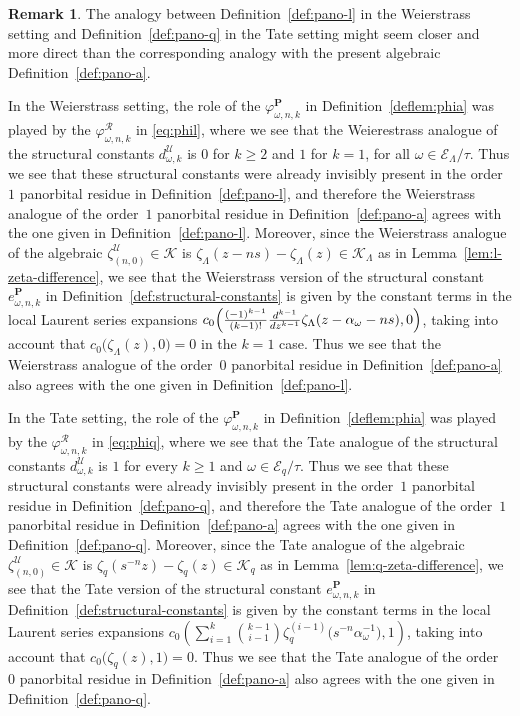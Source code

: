 \documentclass[preprint,12pt]{elsarticle}
\numberwithin{equation}{section} %
\theoremstyle{theorem}
\theoremstyle{definition}
\newtheorem{remark}[theorem]{Remark}
\newcommand{\bk}{\mathcal{K}} %
\newcommand{\bkl}{\bk_{\Lambda}} %
\newcommand{\bkq}{\bk_{q}} %
\newcommand{\ec}{\mathcal{E}} %
\newcommand{\ecl}{\ec_{\Lambda}} %
\newcommand{\orbitl}{{\ecl/\tau}} %
\newcommand{\ecq}{\ec_{q}}
\newcommand{\orbitq}{{\ecq/\tau}} %
\newcommand{\zl}{\zeta_{\Lambda}}
\newcommand{\zq}{\zeta_{q}}
\newcommand{\zqd}[1]{\zq^{({#1})}} %
\newcommand{\za}[2]{\zeta^{\mathcal{U}}_{( {#1} , {#2} )}}
\begin{document}
\begin{remark}\label{rem:pano-analogue}
    The analogy between Definition~\ref{def:pano-l} in the Weierstrass setting and Definition~\ref{def:pano-q} in the Tate setting might seem closer and more direct than the corresponding analogy with the present algebraic Definition~\ref{def:pano-a}. 

    In the Weierstrass setting, the role of the $\varphi^\mathbf{P}_{\omega,n,k}$ in Definition~\ref{deflem:phia} was played by the $\varphi^\mathcal{R}_{\omega,n,k}$ in \eqref{eq:phil}, where we see that the Weierestrass analogue of the structural constants $d^\mathcal{U}_{\omega,k}$ is $0$ for $k\geq 2$ and $1$ for $k=1$, for all $\omega\in\orbitl$. Thus we see that these structural constants were already invisibly present in the order~$1$ panorbital residue in Definition~\ref{def:pano-l}, and therefore the Weierstrass analogue of the order~$1$ panorbital residue in Definition~\ref{def:pano-a} agrees with the one given in Definition~\ref{def:pano-l}. Moreover, since the Weierstrass analogue of the algebraic $\za{n}{0}\in\bk$ is $\zl(z-ns)-\zl(z)\in\bkl$ as in Lemma~\ref{lem:l-zeta-difference}, we see that the Weierstrass version of the structural constant $e^\mathbf{P}_{\omega,n,k}$ in Definition~\ref{def:structural-constants} is given by the constant terms in the local Laurent series expansions $c_0\Bigl(\frac{(-1)^{k-1}}{(k-1)!}\frac{d^{k-1}}{dz^{k-1}}\zl(z-\alpha_\omega-ns),0\Bigr)$, taking into account that $c_0\bigl(\zl(z),0\bigr)=0$ in the $k=1$ case. Thus we see that the Weierstrass analogue of the order~$0$ panorbital residue in Definition~\ref{def:pano-a} also agrees with the one given in Definition~\ref{def:pano-l}.

    In the Tate setting, the role of the $\varphi^\mathbf{P}_{\omega,n,k}$ in Definition~\ref{deflem:phia} was played by the $\varphi^\mathcal{R}_{\omega,n,k}$ in \eqref{eq:phiq}, where we see that the Tate analogue of the structural constants $d^\mathcal{U}_{\omega,k}$ is $1$ for every $k\geq 1$ and $\omega\in\orbitq$. Thus we see that these structural constants were already invisibly present in the order~$1$ panorbital residue in Definition~\ref{def:pano-q}, and therefore the Tate analogue of the order~$1$ panorbital residue in Definition~\ref{def:pano-a} agrees with the one given in Definition~\ref{def:pano-q}. Moreover, since the Tate analogue of the algebraic $\za{n}{0}\in\bk$ is $\zq(s^{-n}z)-\zq(z)\in\bkq$ as in Lemma~\ref{lem:q-zeta-difference}, we see that the Tate version of the structural constant $e^\mathbf{P}_{\omega,n,k}$ in Definition~\ref{def:structural-constants} is given by the constant terms in the local Laurent series expansions $c_0\left(\sum_{i=1}^k\binom{k-1}{i-1}\zqd{i-1}\bigl(s^{-n}\alpha_\omega^{-1}\bigr),1\right)$, taking into account that $c_0\bigl(\zq(z),1\bigr)=0$. Thus we see that the Tate analogue of the order~$0$ panorbital residue in Definition~\ref{def:pano-a} also agrees with the one given in Definition~\ref{def:pano-q}.
    

\end{remark}
\end{document}

